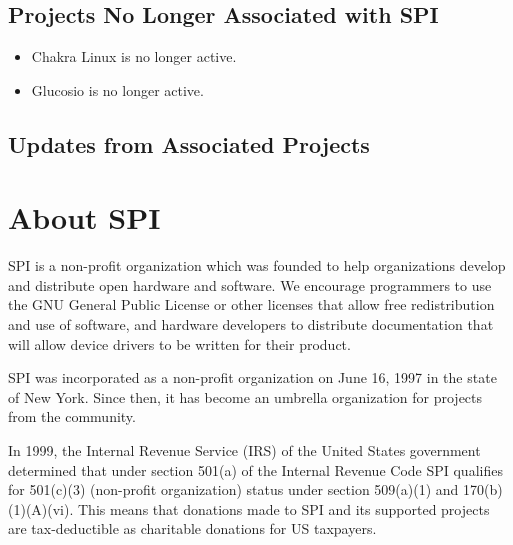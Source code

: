 \documentclass[a4paper]{report}
\begin{document}
\section{Projects No Longer Associated with SPI}

\begin{itemize}

\item Chakra Linux is no longer active.

\item Glucosio is no longer active.

\end{itemize}

\section{Updates from Associated Projects}



\appendix
\chapter{About SPI}

SPI is a non-profit organization which was founded to help organizations develop and distribute open hardware and software. We encourage programmers to use the GNU General Public License or other licenses that allow free redistribution and use of software, and hardware developers to distribute documentation that will allow device drivers to be written for their product.

SPI was incorporated as a non-profit organization on June 16, 1997 in the state of New York. Since then, it has become an umbrella organization for projects from the community.

In 1999, the Internal Revenue Service (IRS) of the United States government determined that under section 501(a) of the Internal Revenue Code SPI qualifies for 501(c)(3) (non-profit organization) status under section 509(a)(1) and 170(b)(1)(A)(vi). This means that donations made to SPI and its supported projects are tax-deductible as charitable donations for US taxpayers.

\newpage

\pagestyle{empty}
\end{document}
